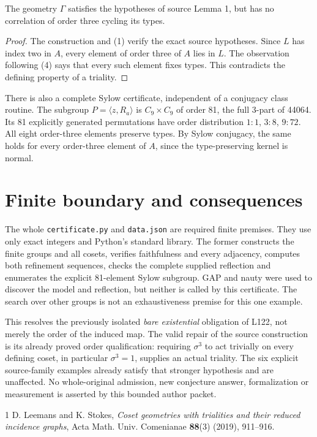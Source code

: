 \documentclass[11pt,a4paper]{article}
\newcommand{\gen}[1]{\langle #1\rangle}
\begin{document}
\begin{theorem}
The geometry $\Gamma$ satisfies the hypotheses of source Lemma 1, but
has no correlation of order three cycling its types.
\end{theorem}
\begin{proof}
The construction and (1) verify the exact source hypotheses. Since $L$
has index two in $A$, every element of order three of $A$ lies in $L$.
The observation following (4) says that every such element fixes types.
This contradicts the defining property of a triality.
\end{proof}
There is also a complete Sylow certificate, independent of a conjugacy
class routine. The subgroup $P=\gen{z,R_a}$ is $C_9\times C_9$ of order
81, the full 3-part of 44064. Its 81 explicitly generated permutations
have order distribution $1:1$, $3:8$, $9:72$. All eight order-three
elements preserve types. By Sylow conjugacy, the same holds for every
order-three element of $A$, since the type-preserving kernel is normal.

\section{Finite boundary and consequences}
The whole \texttt{certificate.py} and \texttt{data.json} are required
finite premises. They use only exact integers and Python's standard
library. The former constructs the finite groups and all cosets, verifies
faithfulness and every adjacency, computes both refinement sequences,
checks the complete supplied reflection and enumerates the explicit
81-element Sylow subgroup. GAP and nauty were used to discover the model
and reflection, but neither is called by this certificate. The search
over other groups is not an exhaustiveness premise for this one example.

This resolves the previously isolated \emph{bare existential} obligation
of L122, not merely the order of the induced map. The valid repair of the
source construction is its already proved order qualification: requiring
$\sigma^3$ to act trivially on every defining coset, in particular
$\sigma^3=1$, supplies an actual triality. The six explicit source-family
examples already satisfy that stronger hypothesis and are unaffected.
No whole-original admission, new conjecture answer, formalization or
measurement is asserted by this bounded author packet.

\begin{thebibliography}{1}
 D. Leemans and K. Stokes,
\emph{Coset geometries with trialities and their reduced incidence graphs},
Acta Math. Univ. Comenianae \textbf{88}(3) (2019), 911--916.
\end{thebibliography}
\end{document}
